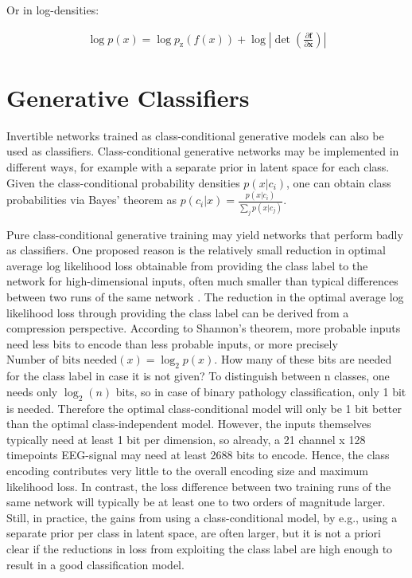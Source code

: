Or in log-densities:

\begin{align}
\log p(x) = \log p_\textrm{z}(f(x)) + \log |\det \left( \frac{\partial \mathbf{f}}{\partial \mathbf{x}} \right)|
\end{align}

\section{Generative Classifiers}\label{generative-classifiers}

    Invertible networks trained as class-conditional generative models can
also be used as classifiers. Class-conditional generative networks may
be implemented in different ways, for example with a separate prior in
latent space for each class. Given the class-conditional probability
densities $p(x|c_i)$, one can obtain class probabilities via Bayes'
theorem as $p(c_i|x)=\frac{p(x|c_i)}{\sum_jp(x|c_j)}$.

Pure class-conditional generative training may yield networks that
perform badly as classifiers. One proposed reason is the relatively
small reduction in optimal average log likelihood loss obtainable from
providing the class label to the network for high-dimensional inputs,
often much smaller than typical differences between two runs of the same
network \citep{DBLP:journals/corr/TheisOB15}. The reduction
in the optimal average log likelihood loss through providing the class
label can be derived from a compression perspective. According to
Shannon's theorem, more probable inputs need less bits to encode than
less probable inputs, or more precisely
$\textrm{Number of bits needed}(x) = \log_2 p(x)$. How many of these
bits are needed for the class label in case it is not given? To
distinguish between n classes, one needs only $\log_2(n)$ bits, so in
case of binary pathology classification, only 1 bit is needed. Therefore
the optimal class-conditional model will only be 1 bit better than the
optimal class-independent model. However, the inputs themselves
typically need at least 1 bit per dimension, so already, a 21 channel x
128 timepoints EEG-signal may need at least 2688 bits to encode. Hence,
the class encoding contributes very little to the overall encoding size
and maximum likelihood loss. In contrast, the loss difference between
two training runs of the same network will typically be at least one to
two orders of magnitude larger. Still, in practice, the gains from using
a class-conditional model, by e.g., using a separate prior per class in
latent space, are often larger, but it is not a priori clear if the
reductions in loss from exploiting the class label are high enough to
result in a good classification model.

